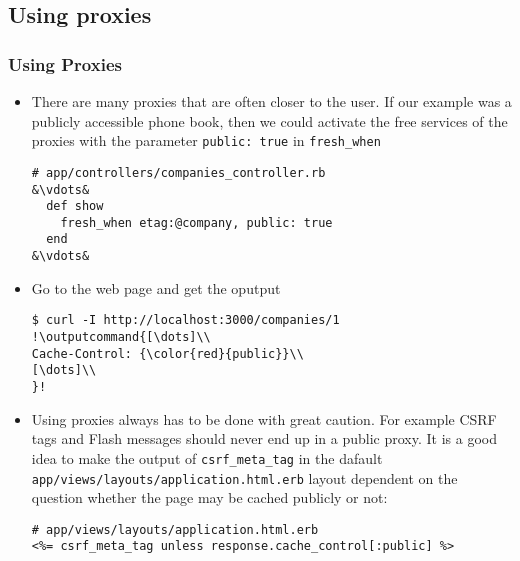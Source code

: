 \documentclass{beamer}
\newcommand{\outputcommand}[1]{\color{darkgreen}{#1}}
\begin{document}
\begin{frame}
\subsection{Using proxies}
\frametitle{Using Proxies}
\begin{itemize}
\item There are many proxies that are often closer to the user. If our example was a publicly accessible phone book, then we could activate the free services of the proxies with the parameter \texttt{public: true} in \texttt{fresh\_when}

\lstset{language=Ruby, style=eclipse}
\begin{lstlisting}[escapechar=&]
# app/controllers/companies_controller.rb
&\vdots&
  def show
    fresh_when etag:@company, public: true
  end
&\vdots&
\end{lstlisting}

\item Go to the web page and get the oputput
\lstset{language=shell}
\begin{lstlisting}[escapechar=!]
$ curl -I http://localhost:3000/companies/1
!\outputcommand{[\dots]\\
Cache-Control: {\color{red}{public}}\\
[\dots]\\
}!
\end{lstlisting}

\item Using proxies always has to be done with great caution. For example CSRF tags and Flash messages should never end up in a public proxy. It is a good idea to make the output of \texttt{csrf\_meta\_tag} in the dafault \texttt{app/views/layouts/application.html.erb} layout dependent on the question whether the page may be cached publicly or not:
\lstset{language=Ruby, style=eclipse}
\begin{lstlisting}[escapechar=&]
# app/views/layouts/application.html.erb
<%= csrf_meta_tag unless response.cache_control[:public] %>
\end{lstlisting}
 
\end{itemize}
\end{frame}

\end{document}
